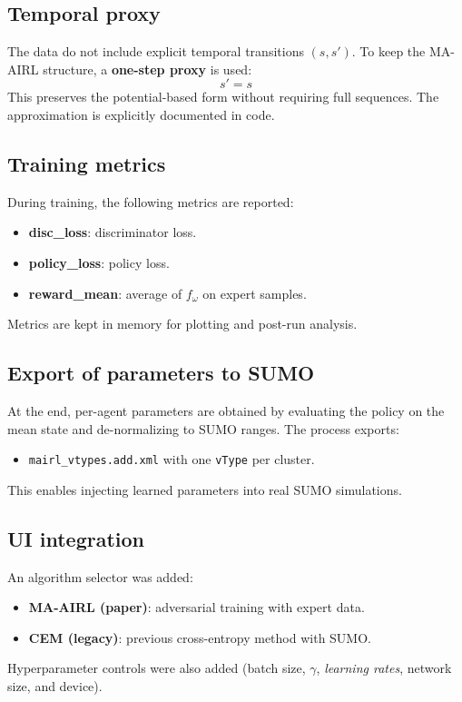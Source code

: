 \subsection{Temporal proxy}
The data do not include explicit temporal transitions $(s,s')$. To keep the MA-AIRL structure, a \textbf{one-step proxy} is used:
\[
s' = s
\]
This preserves the potential-based form without requiring full sequences. The approximation is explicitly documented in code.

\subsection{Training metrics}
During training, the following metrics are reported:
\begin{itemize}
\item \textbf{disc\_loss}: discriminator loss.
\item \textbf{policy\_loss}: policy loss.
\item \textbf{reward\_mean}: average of $f_\omega$ on expert samples.
\end{itemize}
Metrics are kept in memory for plotting and post-run analysis.

\subsection{Export of parameters to SUMO}
At the end, per-agent parameters are obtained by evaluating the policy on the mean state and de-normalizing to SUMO ranges. The process exports:
\begin{itemize}
\item \texttt{mairl\_vtypes.add.xml} with one \texttt{vType} per cluster.
\end{itemize}
This enables injecting learned parameters into real SUMO simulations.

\subsection{UI integration}
An algorithm selector was added:
\begin{itemize}
\item \textbf{MA-AIRL (paper)}: adversarial training with expert data.
\item \textbf{CEM (legacy)}: previous cross-entropy method with SUMO.
\end{itemize}
Hyperparameter controls were also added (batch size, $\gamma$, \textit{learning rates}, network size, and device).

